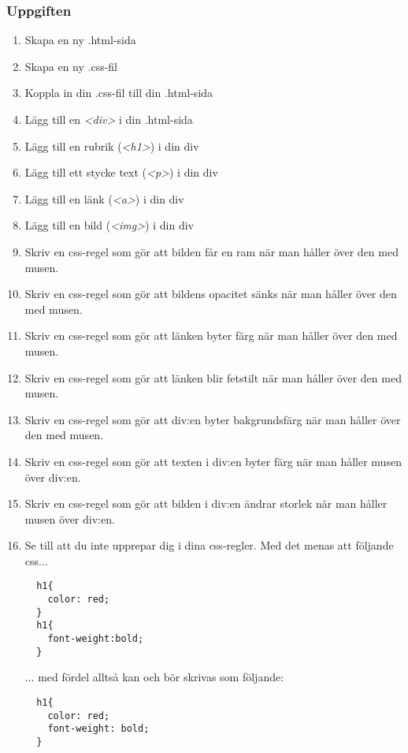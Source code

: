 \documentclass{article}
\begin{document}
    \subsubsection*{Uppgiften}
      \begin{enumerate}
        \item Skapa en ny .html-sida
        \item Skapa en ny .css-fil
        \item Koppla in din .css-fil till din .html-sida
        \item Lägg till en \emph{<div>} i din .html-sida
        \item Lägg till en rubrik (\emph{<h1>}) i din div
        \item Lägg till ett stycke text (\emph{<p>}) i din div
        \item Lägg till en länk (\emph{<a>}) i din div
        \item Lägg till en bild (\emph{<img>}) i din div
        \item Skriv en css-regel som gör att bilden får en ram när man håller över den med musen.
        \item Skriv en css-regel som gör att bildens opacitet sänks när man håller över den med musen.
        \item Skriv en css-regel som gör att länken byter färg när man håller över den med musen.
        \item Skriv en css-regel som gör att länken blir fetstilt när man håller över den med musen.
        \item Skriv en css-regel som gör att div:en byter bakgrundsfärg när man håller över den med musen.
        \item Skriv en css-regel som gör att texten i div:en byter färg när man håller musen över div:en.
        \item Skriv en css-regel som gör att bilden i div:en ändrar storlek när man håller musen över div:en.
        \item Se till att du inte upprepar dig i dina css-regler.
          Med det menas att följande css...
          \begin{lstlisting}
  h1{
    color: red;
  }
  h1{
    font-weight:bold;
  }
          \end{lstlisting}
          ... med fördel alltså kan och bör skrivas som följande:
          \begin{lstlisting}
  h1{
    color: red;
    font-weight: bold;
  }
          \end{lstlisting}
      \end{enumerate}
\end{document}
